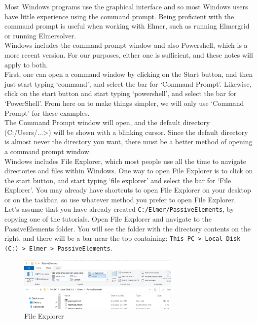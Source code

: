 Most Windows programs use the graphical interface and so most Windows users have little experience using the command prompt.  Being proficient with the command prompt is useful when working with Elmer, such as running Elmergrid or running Elmersolver.\\

Windows includes the command prompt window and also Powershell, which is a more recent version.  For our purposes, either one is sufficient, and these notes will apply to both.\\

First, one can open a command window by clicking on the Start button, and then just start typing `command', and select the bar for `Command Prompt'.  Likewise, click on the start button and start typing `powershell', and select the bar for `PowerShell'.  From here on to make things simpler, we will only use `Command Prompt' for these examples.\\

The Command Prompt window will open, and the default directory (C:/Users/...>) will be shown with a blinking cursor.  Since the default directory is almost never the directory you want, there must be a better method of opening a command prompt window.\\

Windows includes File Explorer, which most people use all the time to navigate directories and files within Windows.  One way to open File Explorer is to click on the start button, and start typing `file explorer' and select the bar for `File Explorer'.  You may already have shortcuts to open File Explorer on your desktop or on the taskbar, so use whatever method you prefer to open File Explorer.\\

Let's assume that you have already created \texttt{C:/Elmer/PassiveElements}, by copying one of the tutorials.  Open File Explorer and navigate to the PassiveElements folder.  You will see the folder with the directory contents on the right, and there will be a bar near the top containing: \texttt{This PC > Local Disk (C:) > Elmer > PassiveElements}.

\begin{figure}[H]
\centering
\includegraphics[width=0.7\textwidth]{cmd-1}
\caption{File Explorer}\label{fg:cmd-1}
\end{figure}

